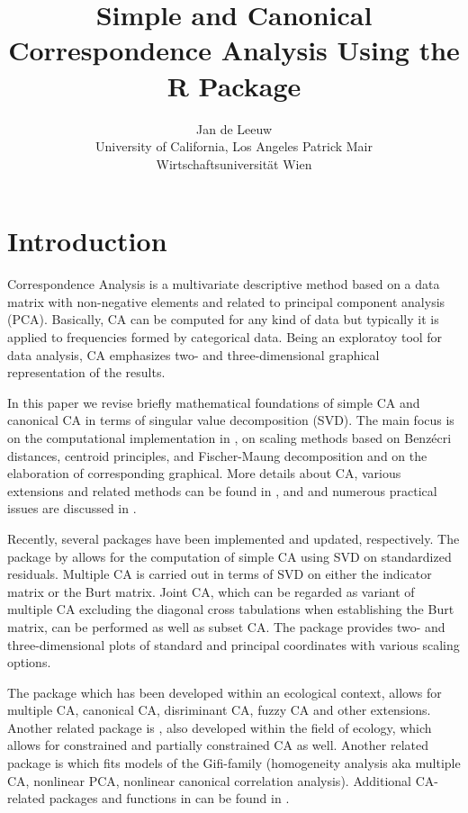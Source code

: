 \documentclass[article]{Z}
\author{Jan de Leeuw\\University of California, Los Angeles \And 
        Patrick Mair \\Wirtschaftsuniversit\"at Wien}
\title{Simple and Canonical Correspondence Analysis Using the R Package \pkg{anacor}}
\begin{document}
\section{Introduction}
Correspondence Analysis \citep[CA;][]{Benzecri:73} is a multivariate descriptive method based on a data matrix with non-negative elements and related to principal component analysis (PCA). Basically, CA can be computed for any kind of data but typically it is applied to frequencies formed by categorical data. Being an exploratoy tool for data analysis, CA emphasizes two- and three-dimensional graphical representation of the results. 

In this paper we revise briefly mathematical foundations of simple CA and canonical CA in terms of singular value decomposition (SVD). The main focus is on the computational implementation in  \citep{R:07}, on scaling methods based on Benz\'ecri distances, centroid principles, and Fischer-Maung decomposition and on the elaboration of corresponding graphical. More details about CA, various extensions and related methods can be found in \citet{Greenacre:84}, \citet{Gifi:90} and \citet{Greenacre+Blasius:06} and numerous practical issues are discussed in \citet{Greenacre:07}.

Recently, several  packages have been implemented and updated, respectively. The  package by \citet{Nenadic+Greenacre:06} allows for the computation of simple CA using SVD on standardized residuals. Multiple CA is carried out in terms of SVD on either the indicator matrix or the Burt matrix. Joint CA, which can be regarded as variant of multiple CA excluding the diagonal cross tabulations when establishing the Burt matrix, can be performed as well as subset CA. The package provides two- and three-dimensional plots of standard and principal coordinates with various scaling options. 

The  package \citep{Chessel+Dufour+Thioulouse:04, Dray+Dufour+Chessel:07} which has been developed within an ecological context, allows for  multiple CA, canonical CA, disriminant CA, fuzzy CA and other extensions. Another related package is  \citep{dixon:03}, also developed within the field of ecology, which allows for constrained and partially constrained CA as well. Another related package is  \citep{deLeeuw+Mair:08} which fits models of the Gifi-family (homogeneity analysis aka multiple CA, nonlinear PCA, nonlinear canonical correlation analysis). Additional CA-related packages and functions in  can be found in \citet{Mair+Hatzinger:07}.
\end{document}
